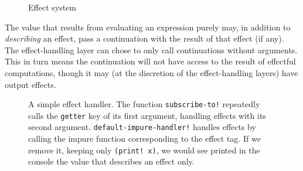 \begin{figure}[H]
\caption{Effect system}
\label{f:effects}
\end{figure}

The value that results from evaluating an expression purely may, in addition to
\emph{describing} an effect, pass a continuation with the result of that
effect (if any). The effect-handling layer can chose to only call continuations
without arguments. This in turn means the continuation will not have access to
the result of effectful computations, though it may (at the discretion of the
effect-handling layers) have output effects.

\begin{figure}[H]

    \caption{A simple effect handler. The function \texttt{subscribe-to!}
    repeatedly calls the \texttt{getter} key of its first argument, handling
    effects with its second argument. \texttt{default-impure-handler!} handles
    effects by calling the impure function corresponding to the effect tag. If
    we remove it, keeping only \texttt{(print! x)}, we would see printed in the
    console the value that describes an effect only.}
\label{f:eff-handler}
\end{figure}

